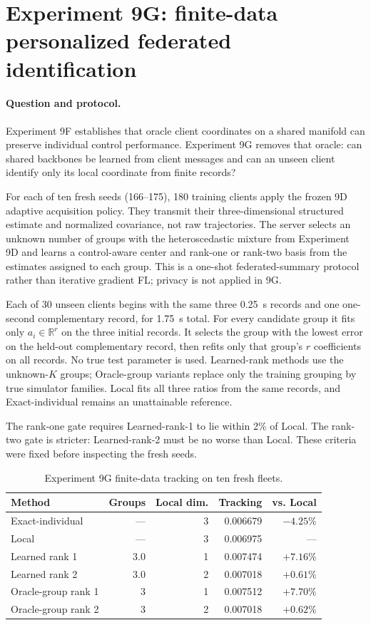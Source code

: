 \section{Experiment 9G: finite-data personalized federated identification}
\label{sec:experiment9g}

\paragraph{Question and protocol.}
Experiment 9F establishes that oracle client coordinates on a shared manifold
can preserve individual control performance. Experiment 9G removes that oracle:
can shared backbones be learned from client messages and can an unseen client
identify only its local coordinate from finite records?

For each of ten fresh seeds (166--175), 180 training clients apply the frozen
9D adaptive acquisition policy. They transmit their three-dimensional
structured estimate and normalized covariance, not raw trajectories. The server
selects an unknown number of groups with the heteroscedastic mixture from
Experiment 9D and learns a control-aware center and rank-one or rank-two basis
from the estimates assigned to each group. This is a one-shot federated-summary
protocol rather than iterative gradient FL; privacy is not applied in 9G.

Each of 30 unseen clients begins with the same three 0.25~s records and one
one-second complementary record, for 1.75~s total. For every candidate group it
fits only $a_i\in\mathbb{R}^r$ on the three initial records. It selects the group
with the lowest error on the held-out complementary record, then refits only
that group's $r$ coefficients on all records. No true test parameter is used.
Learned-rank methods use the unknown-$K$ groups; Oracle-group variants replace
only the training grouping by true simulator families. Local fits all three
ratios from the same records, and Exact-individual remains an unattainable
reference.

The rank-one gate requires Learned-rank-1 to lie within 2\% of Local. The
rank-two gate is stricter: Learned-rank-2 must be no worse than Local. These
criteria were fixed before inspecting the fresh seeds.

\begin{table}[htbp]
\centering
\caption{Experiment 9G finite-data tracking on ten fresh fleets.}
\label{tab:experiment9g-results}
\begin{tabular}{lrrrr}
\toprule
Method & Groups & Local dim. & Tracking & vs. Local\\
\midrule
Exact-individual & --- & 3 & 0.006679 & $-4.25\%$\\
Local & --- & 3 & 0.006975 & ---\\
Learned rank 1 & 3.0 & 1 & 0.007474 & $+7.16\%$\\
Learned rank 2 & 3.0 & 2 & 0.007018 & $+0.61\%$\\
Oracle-group rank 1 & 3 & 1 & 0.007512 & $+7.70\%$\\
Oracle-group rank 2 & 3 & 2 & 0.007018 & $+0.62\%$\\
\bottomrule
\end{tabular}
\end{table}

